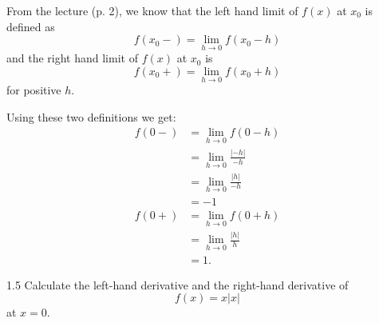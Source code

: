 \begin{derivation}
  From the lecture (p. 2), we know that the left hand limit of $f(x)$ at $x_0$ is defined as
  \begin{equation*}
    f(x_0 -) = \lim_{h \to 0} f(x_0 - h)
  \end{equation*}
  and the right hand limit of $f(x)$ at $x_0$ is
  \begin{equation*}
    f(x_0 +) = \lim_{h \to 0} f(x_0 + h)
  \end{equation*}
  for positive $h$.

  Using these two definitions we get:
  \begin{align*}
    f(0 -) &= \lim_{h \to 0} f(0 - h) \\
    &= \lim_{h \to 0} \frac{\left| -h \right|}{- h} \\
    &= \lim_{h \to 0}\frac{|h|}{-h} \\
    &= -1 \\
    f(0+) &= \lim_{h \to 0} f(0 + h) \\
    &= \lim_{h \to 0} \frac{\left| h \right|}{h} \\
    &= 1
  .\end{align*}
\end{derivation}


\begin{problem}{1.5}
  Calculate the left-hand derivative and the right-hand derivative of
  \begin{equation*}
    f(x) = x |x|
  \end{equation*}
  at $x = 0$.
\end{problem}

